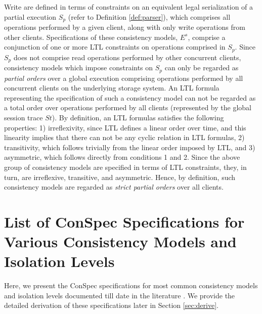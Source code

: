 \documentclass{sig-alternate-05-2015}
\begin{document}
   Write are
  defined in terms of constraints on an equivalent legal serialization of a partial execution $S_p$ (refer to Definition \ref{def:parser}), which comprises all operations performed by
  a given client, along with only write operations from other clients. Specifications of these consistency models, $E^s$, comprise a
   conjunction of one or more LTL constraints on operations comprised in $S_p$. Since $S_p$ %
   does not comprise read operations performed by other concurrent clients, consistency models which impose constraints on $S_p$ can only be regarded as \emph{partial orders} over a global execution comprising operations performed by all concurrent clients on the underlying storage system. An LTL formula representing the specification of such a consistency model can not be regarded as a total order over operations performed by all clients (represented by the global session trace $\mathit{St}$). By definition, an LTL formulas satisfies the following properties: 1) irreflexivity, since LTL defines a linear order over time, and this linearity implies that there can not be any cyclic relation in LTL formulas, 2)  transitivity, which follows trivially from the linear order imposed by LTL, and 3) asymmetric, which follows directly from conditions 1 and 2. Since the above group of consistency models are specified in terms of LTL constraints, they, in turn, are irreflexive, transitive, and asymmetric. Hence, by definition, such consistency models are regarded as \emph{strict partial orders} over all clients.    
  
 \section{List of ConSpec Specifications for Various Consistency Models and Isolation Levels}
  Here, we present the ConSpec specifications for most common consistency models and isolation levels documented till date in the literature \cite{Chockler2000, Terry:1994:SGW:645792.668302, Burckhardt:2014:PEC:2693641.2693642}. We provide the detailed derivation of these specifications later in Section \ref{sec:derive}.
\end{document}
